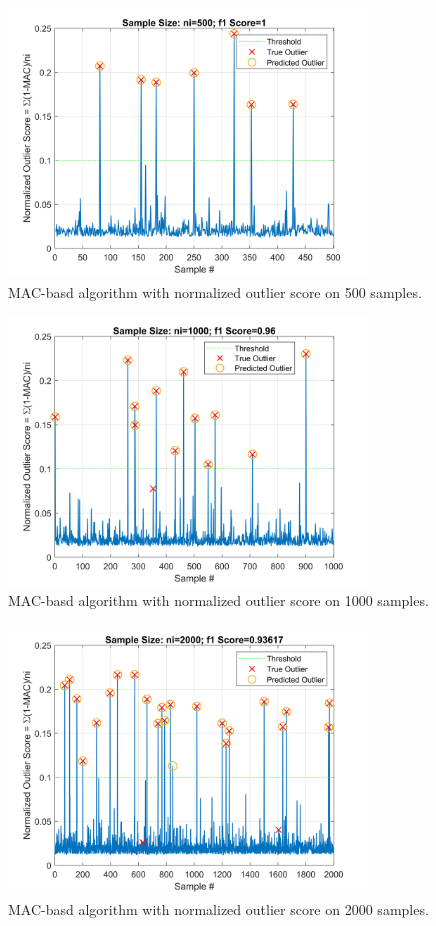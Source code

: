 \documentclass[12pt]{article}
\begin{document}
\begin{figure}[ht!]
\centering
\includegraphics[width=0.85\textwidth]{f1score_ni500}
\caption{MAC-basd algorithm with normalized outlier score on 500 samples.}
\label{fig:fig9}
\end{figure}

\begin{figure}[ht!]
\centering
\includegraphics[width=0.85\textwidth]{f1score_ni1000}
\caption{MAC-basd algorithm with normalized outlier score on 1000 samples.}
\label{fig:fig10}
\end{figure}

\begin{figure}[ht!]
\centering
\includegraphics[width=0.85\textwidth]{f1score_ni2000}
\caption{MAC-basd algorithm with normalized outlier score on 2000 samples.}
\label{fig:fig11}
\end{figure}
\end{document}

